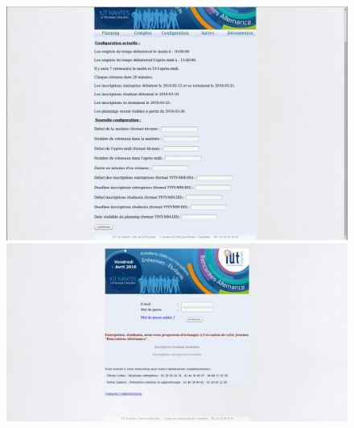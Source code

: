 \documentclass[12pt,a4paper]{article}
\begin{document}
\begin{figure}
  \centering
  \includegraphics[scale=0.4]{figure8(3_3).jpg}
  \includegraphics[scale=0.4]{figure13(3_2).jpg}
\end{figure}
\end{document}
